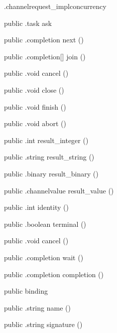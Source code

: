 \begin{CrexxClass}{.channelrequest\_impl}{concurrency}
\begin{Members}
    \Method
      {public}
      {.task}
      {ask}
      {}

    \Method
      {public}
      {.completion}
      {next}
      {()}

    \Method
      {public}
      {.completion[]}
      {join}
      {()}

    \Method
      {public}
      {.void}
      {cancel}
      {()}

    \Method
      {public}
      {.void}
      {close}
      {()}

    \Method
      {public}
      {.void}
      {finish}
      {()}

    \Method
      {public}
      {.void}
      {abort}
      {()}

    \Method
      {public}
      {.int}
      {result\_integer}
      {()}

    \Method
      {public}
      {.string}
      {result\_string}
      {()}

    \Method
      {public}
      {.binary}
      {result\_binary}
      {()}

    \Method
      {public}
      {.channelvalue}
      {result\_value}
      {()}

    \Method
      {public}
      {.int}
      {identity}
      {()}

    \Method
      {public}
      {.boolean}
      {terminal}
      {()}

    \Method
      {public}
      {.void}
      {cancel}
      {()}

    \Method
      {public}
      {.completion}
      {wait}
      {()}

    \Method
      {public}
      {.completion}
      {completion}
      {()}

    \Factory
      {public}
      {binding}
      {}

    \Method
      {public}
      {.string}
      {name}
      {()}

    \Method
      {public}
      {.string}
      {signature}
      {()}


\end{Members}
\end{CrexxClass}
